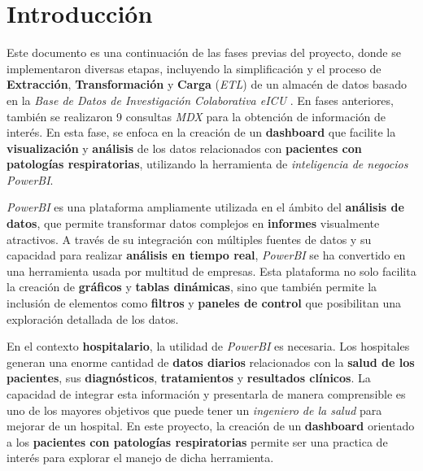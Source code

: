 \documentclass[12pt, a4paper, twoside]{article}
\begin{document}
	
	
	
	\clearpage
	\setcounter{page}{1}
	
	
	
	\tableofcontents
	\newpage
	
	\section{Introducción}
	
	Este documento es una continuación de las fases previas del proyecto, donde se implementaron diversas etapas, incluyendo la simplificación y el proceso de \textbf{Extracción}, \textbf{Transformación} y \textbf{Carga} (\textit{ETL}) de un almacén de datos basado en la \textit{Base de Datos de Investigación Colaborativa eICU} \cite{eICU2024}. En fases anteriores, también se realizaron 9 consultas \textit{MDX} para la obtención de información de interés. En esta fase, se enfoca en la creación de un \textbf{dashboard} que facilite la \textbf{visualización} y \textbf{análisis} de los datos relacionados con \textbf{pacientes con patologías respiratorias}, utilizando la herramienta de \textit{inteligencia de negocios PowerBI}.
	
	\textit{PowerBI} es una plataforma ampliamente utilizada en el ámbito del \textbf{análisis de datos}, que permite transformar datos complejos en \textbf{informes} visualmente atractivos. A través de su integración con múltiples fuentes de datos y su capacidad para realizar \textbf{análisis en tiempo real}, \textit{PowerBI} se ha convertido en una herramienta usada por multitud de empresas. Esta plataforma no solo facilita la creación de \textbf{gráficos} y \textbf{tablas dinámicas}, sino que también permite la inclusión de elementos como \textbf{filtros} y \textbf{paneles de control} que posibilitan una exploración detallada de los datos.
	
	En el contexto \textbf{hospitalario}, la utilidad de \textit{PowerBI} es necesaria. Los hospitales generan una enorme cantidad de \textbf{datos diarios} relacionados con la \textbf{salud de los pacientes}, sus \textbf{diagnósticos}, \textbf{tratamientos} y \textbf{resultados clínicos}. La capacidad de integrar esta información y presentarla de manera comprensible es uno de los mayores objetivos que puede tener un \textit{ingeniero de la salud} para mejorar de un hospital. En este proyecto, la creación de un \textbf{dashboard} orientado a los \textbf{pacientes con patologías respiratorias} permite ser una practica de interés para explorar el manejo de dicha herramienta.
	
\end{document}
